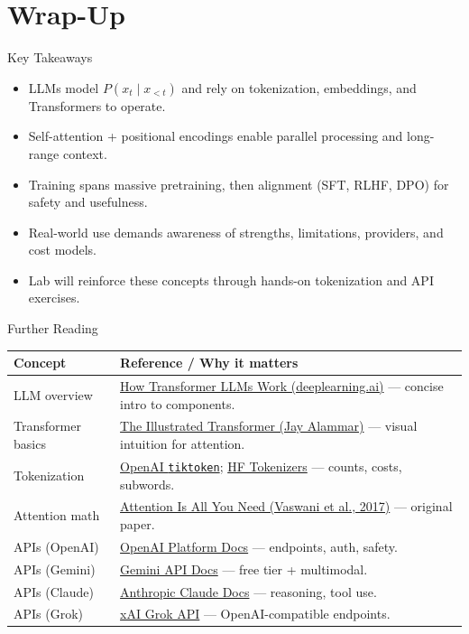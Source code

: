 \documentclass[aspectratio=169]{beamer}
\begin{document}
\section{Wrap-Up}

\begin{frame}{Key Takeaways}
  \begin{itemize}
    \item LLMs model $P(x_t \mid x_{<t})$ and rely on tokenization, embeddings, and Transformers to operate.
    \item Self-attention + positional encodings enable parallel processing and long-range context.
    \item Training spans massive pretraining, then alignment (SFT, RLHF, DPO) for safety and usefulness.
    \item Real-world use demands awareness of strengths, limitations, providers, and cost models.
    \item Lab will reinforce these concepts through hands-on tokenization and API exercises.
  \end{itemize}
\end{frame}

\begin{frame}{Further Reading}
  \vspace{-0.4em}
  \begin{tabular}{@{}p{3.8cm}p{7.8cm}@{}}
    \toprule
    \textbf{Concept} & \textbf{Reference / Why it matters} \\
    \midrule
    LLM overview & \href{https://learn.deeplearning.ai/courses/how-transformer-llms-work}{How Transformer LLMs Work (deeplearning.ai)} — concise intro to components. \\
    Transformer basics & \href{https://jalammar.github.io/illustrated-transformer/}{The Illustrated Transformer (Jay Alammar)} — visual intuition for attention. \\
    Tokenization & \href{https://github.com/openai/tiktoken}{OpenAI \texttt{tiktoken}}; \href{https://huggingface.co/docs/tokenizers/index}{HF Tokenizers} — counts, costs, subwords. \\
    Attention math & \href{https://arxiv.org/abs/1706.03762}{Attention Is All You Need (Vaswani et al., 2017)} — original paper. \\
    APIs (OpenAI) & \href{https://platform.openai.com/docs}{OpenAI Platform Docs} — endpoints, auth, safety. \\
    APIs (Gemini) & \href{https://ai.google.dev/gemini-api/docs}{Gemini API Docs} — free tier + multimodal. \\
    APIs (Claude) & \href{https://docs.anthropic.com}{Anthropic Claude Docs} — reasoning, tool use. \\
    APIs (Grok) & \href{https://x.ai/api}{xAI Grok API} — OpenAI-compatible endpoints. \\
     \bottomrule
  \end{tabular}
\end{frame}
\end{document}
